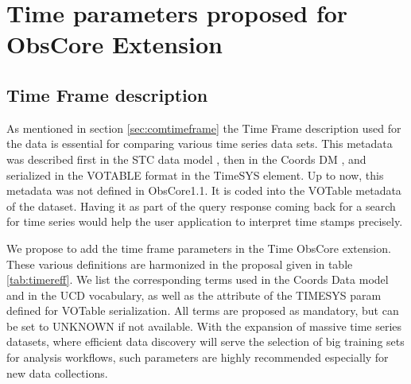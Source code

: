 \documentclass[11pt,a4paper]{ivoa}
\begin{document}
 \section{Time parameters proposed for ObsCore Extension }
 \label{sec:timeext}

  \subsection{Time Frame description}
 As mentioned in section \ref{sec:comtimeframe} the Time Frame description used for the data is essential for comparing various time series data sets.
This metadata was described first in the STC data model  \citep{2007ivoa.spec.1030R}, then  in the Coords DM \citep{2022ivoa.specQ1004R}, and serialized in the  VOTABLE format in the TimeSYS element.
Up to now, this metadata  was not defined in ObsCore1.1. It is coded into the VOTable  metadata of the dataset.
Having  it as  part of the query response coming back for a search for time series would help the user application to interpret time stamps precisely.

We propose to add the time frame parameters in the Time ObsCore extension.
These various definitions are harmonized in the proposal given in  table \ref{tab:timereff}. We list the corresponding terms used in the Coords Data model and in the UCD vocabulary, as well as the attribute of the TIMESYS param defined for VOTable serialization.
All terms are proposed as mandatory, but can be set to UNKNOWN if not available.
With the expansion of massive time series datasets, where efficient data discovery will serve the selection of big training sets for analysis workflows,
such parameters are highly recommended especially for new data collections.
\end{document}
